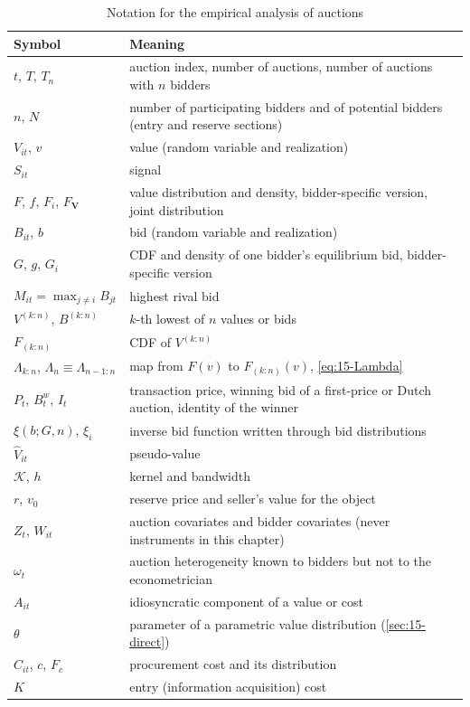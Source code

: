 \begin{table}[htbp]
\centering
\caption{Notation for the empirical analysis of auctions}\label{tab:15-notation}
\small
\begin{tabularx}{\textwidth}{@{}p{3.3cm}>{\raggedright\arraybackslash}X@{}}
\toprule
Symbol & Meaning \\
\midrule
$t$, $T$, $T_n$ & auction index, number of auctions, number of auctions with $n$ bidders \\
$n$, $N$ & number of participating bidders and of potential bidders (entry and reserve sections) \\
$V_{it}$, $v$ & value (random variable and realization) \\
$S_{it}$ & signal \\
$F$, $f$, $F_i$, $F_{\bm V}$ & value distribution and density, bidder-specific version, joint distribution \\
$B_{it}$, $b$ & bid (random variable and realization) \\
$G$, $g$, $G_i$ & CDF and density of one bidder's equilibrium bid, bidder-specific version \\
$M_{it}=\max_{j\neq i}B_{jt}$ & highest rival bid \\
$V^{(k:n)}$, $B^{(k:n)}$ & $k$-th lowest of $n$ values or bids \\
$F_{(k:n)}$ & CDF of $V^{(k:n)}$ \\
$\Lambda_{k:n}$, $\Lambda_n\equiv\Lambda_{n-1:n}$ & map from $F(v)$ to $F_{(k:n)}(v)$, \eqref{eq:15-Lambda} \\
$P_t$, $B^w_t$, $I_t$ & transaction price, winning bid of a first-price or Dutch auction, identity of the winner \\
$\xi(b;G,n)$, $\xi_i$ & inverse bid function written through bid distributions \\
$\hat V_{it}$ & pseudo-value \\
$\mathcal K$, $h$ & kernel and bandwidth \\
$r$, $v_0$ & reserve price and seller's value for the object \\
$Z_t$, $W_{it}$ & auction covariates and bidder covariates (never instruments in this chapter) \\
$\omega_t$ & auction heterogeneity known to bidders but not to the econometrician \\
$A_{it}$ & idiosyncratic component of a value or cost \\
$\theta$ & parameter of a parametric value distribution (\cref{sec:15-direct}) \\
$C_{it}$, $c$, $F_c$ & procurement cost and its distribution \\
$K$ & entry (information acquisition) cost \\
\bottomrule
\end{tabularx}
\end{table}


